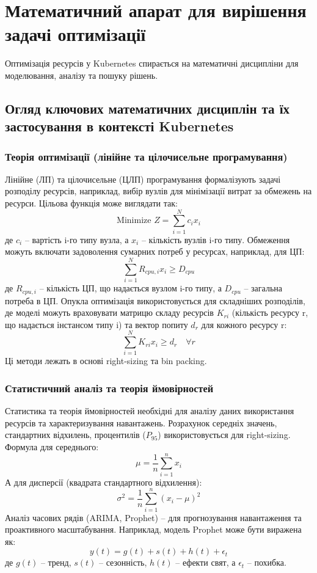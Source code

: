 \chapter{Математичний апарат для вирішення задачі оптимізації}

Оптимізація ресурсів у Kubernetes спирається на математичні дисципліни для моделювання, аналізу та пошуку рішень.

\section{Огляд ключових математичних дисциплін та їх застосування в контексті Kubernetes}

\subsection{Теорія оптимізації (лінійне та цілочисельне програмування)}
Лінійне (ЛП) та цілочисельне (ЦЛП) програмування формалізують задачі розподілу ресурсів, наприклад, вибір вузлів для мінімізації витрат за обмежень на ресурси. Цільова функція може виглядати так:
$$ \text{Minimize } Z = \sum_{i=1}^{N} c_i x_i $$
де $c_i$ – вартість i-го типу вузла, а $x_i$ – кількість вузлів i-го типу. Обмеження можуть включати задоволення сумарних потреб у ресурсах, наприклад, для ЦП:
$$ \sum_{i=1}^{N} R_{cpu,i} x_i \geq D_{cpu} $$
де $R_{cpu,i}$ – кількість ЦП, що надається вузлом i-го типу, а $D_{cpu}$ – загальна потреба в ЦП.
Опукла оптимізація використовується для складніших розподілів, де моделі можуть враховувати матрицю складу ресурсів $K_{ri}$ (кількість ресурсу r, що надається інстансом типу i) та вектор попиту $d_r$ для кожного ресурсу r:
$$ \sum_{i=1}^{N} K_{ri} x_i \geq d_r \quad \forall r $$
Ці методи лежать в основі right-sizing та bin packing.

\subsection{Статистичний аналіз та теорія ймовірностей}
Статистика та теорія ймовірностей необхідні для аналізу даних використання ресурсів та характеризування навантажень. Розрахунок середніх значень, стандартних відхилень, процентилів ($P_{95}$) використовується для right-sizing. Формула для середнього:
$$ \mu = \frac{1}{n} \sum_{i=1}^{n} x_i $$
А для дисперсії (квадрата стандартного відхилення):
$$ \sigma^2 = \frac{1}{n} \sum_{i=1}^{n} (x_i - \mu)^2 $$
Аналіз часових рядів (ARIMA, Prophet) – для прогнозування навантаження та проактивного масштабування. Наприклад, модель Prophet може бути виражена як:
$$ y(t) = g(t) + s(t) + h(t) + \epsilon_t $$
де $g(t)$ – тренд, $s(t)$ – сезонність, $h(t)$ – ефекти свят, а $\epsilon_t$ – похибка.

